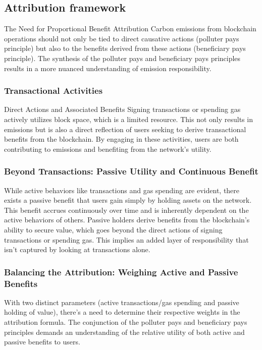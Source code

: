 \documentclass[11pt]{report}
\begin{document}
\subsection{Attribution framework}
The Need for Proportional Benefit Attribution
Carbon emissions from blockchain operations should not only be tied to direct causative actions (polluter pays principle) but also to the benefits derived from these actions (beneficiary pays principle). The synthesis of the polluter pays and beneficiary pays principles results in a more nuanced understanding of emission responsibility.

\subsubsection*{Transactional Activities}

Direct Actions and Associated Benefits
Signing transactions or spending gas actively utilizes block space, which is a limited resource. This not only results in emissions but is also a direct reflection of users seeking to derive transactional benefits from the blockchain. By engaging in these activities, users are both contributing to emissions and benefiting from the network's utility.

\subsubsection*{Beyond Transactions: Passive Utility and Continuous Benefit}
While active behaviors like transactions and gas spending are evident, there exists a passive benefit that users gain simply by holding assets on the network. This benefit accrues continuously over time and is inherently dependent on the active behaviors of others. Passive holders derive benefits from the blockchain's ability to secure value, which goes beyond the direct actions of signing transactions or spending gas. This implies an added layer of responsibility that isn't captured by looking at transactions alone.

\subsubsection*{Balancing the Attribution: Weighing Active and Passive Benefits}
With two distinct parameters (active transactions/gas spending and passive holding of value), there's a need to determine their respective weights in the attribution formula. The conjunction of the polluter pays and beneficiary pays principles demands an understanding of the relative utility of both active and passive benefits to users.
\end{document}
